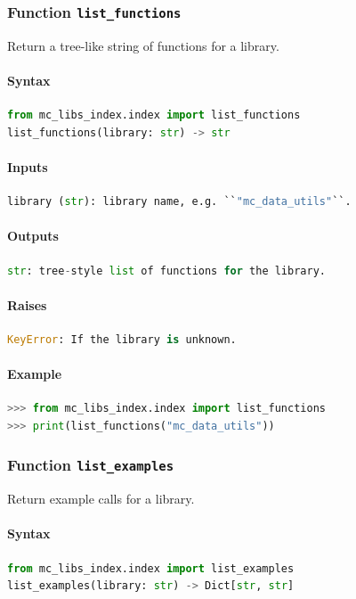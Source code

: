 \documentclass[11pt]{article}
\begin{document}
\subsubsection{Function \texttt{list\_functions}}
Return a tree-like string of functions for a library.

\paragraph{Syntax}
\begin{lstlisting}[language=Python]
from mc_libs_index.index import list_functions
list_functions(library: str) -> str
\end{lstlisting}
\paragraph{Inputs}
\begin{lstlisting}[language=Python]
library (str): library name, e.g. ``"mc_data_utils"``.
\end{lstlisting}
\paragraph{Outputs}
\begin{lstlisting}[language=Python]
str: tree-style list of functions for the library.
\end{lstlisting}
\paragraph{Raises}
\begin{lstlisting}[language=Python]
KeyError: If the library is unknown.
\end{lstlisting}
\paragraph{Example}
\begin{lstlisting}[language=Python]
>>> from mc_libs_index.index import list_functions
>>> print(list_functions("mc_data_utils"))
\end{lstlisting}

\subsubsection{Function \texttt{list\_examples}}
Return example calls for a library.

\paragraph{Syntax}
\begin{lstlisting}[language=Python]
from mc_libs_index.index import list_examples
list_examples(library: str) -> Dict[str, str]
\end{lstlisting}
\end{document}
